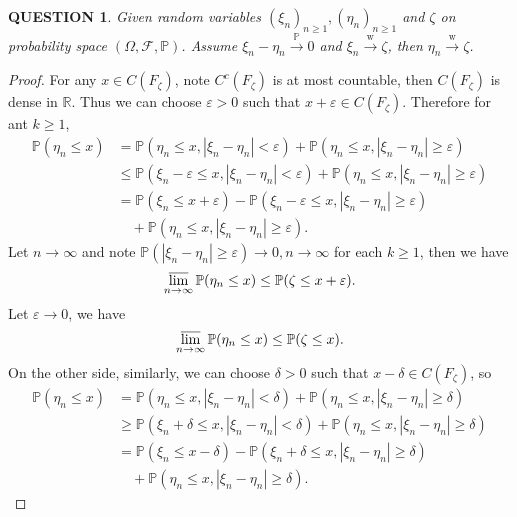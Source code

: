\documentclass[12pt]{article}
\renewcommand{\(}{\left(}%
\renewcommand{\)}{\right)}%
\renewcommand{\[}{\left[}%
\renewcommand{\]}{\right]}%
\renewcommand{\r}{\mathbb{R}}
\newcommand{\p}{\mathbb{P}}
\newcommand{\f}{\mathscr{F}}
\newtheorem{question}{QUESTION}[section]}
\newtheorem{proof}{Proof.}}
\begin{document}
  \begin{question}
  	Given random variables $(\xi_n)_{n\geq 1},(\eta_n)_{n\geq 1}$ and $\zeta$ on probability space $(\Omega,\f,\p)$. Assume $\xi_n-\eta_n\overset{\p}{\to} 0$ and $\xi_n\overset{\mathrm{w}}{\to}\zeta$, then $\eta_n\overset{\mathrm{w}}{\to}\zeta$.
  \end{question}
  \begin{proof}
  	For any $x\in C(F_\zeta)$, note $C^c(F_\zeta)$ is at most countable, then $C(F_\zeta)$ is dense in $\r$. Thus we can choose $\varepsilon>0$ such that $x+\varepsilon\in C(F_\zeta)$. Therefore for ant $k\geq 1$,
  	\begin{equation*}
  		\begin{split}
  			\p(\eta_n\leq x)&=\p(\eta_n\leq x,|\xi_n-\eta_n|<\varepsilon)+\p(\eta_n\leq x,|\xi_n-\eta_n|\geq \varepsilon)\\
  			&\leq \p(\xi_n-\varepsilon\leq x,|\xi_n-\eta_n|<\varepsilon)+\p(\eta_n\leq x,|\xi_n-\eta_n|\geq \varepsilon)\\
  			&=\p(\xi_n\leq x+\varepsilon)-\p(\xi_n-\varepsilon\leq x,|\xi_n-\eta_n|\geq \varepsilon)\\
  			&\quad+\p(\eta_n\leq x,|\xi_n-\eta_n|\geq \varepsilon).
  		\end{split}
  	\end{equation*}
  	Let $n\to\infty$ and note $\p(|\xi_n-\eta_n|\geq \varepsilon)\to0,n\to\infty$ for each $k\geq 1$, then we have
  	\begin{equation*}
  		\varlimsup_{n\to\infty}\p(\eta_n\leq x)\leq \p(\zeta\leq x+\varepsilon).
  	\end{equation*}
  	Let $\varepsilon\to0$, we have 
  	\begin{equation*}
  		\varlimsup_{n\to\infty}\p(\eta_n\leq x)\leq \p(\zeta\leq x).
  	\end{equation*}
  	On the other side, similarly, we can choose $\delta>0$ such that $x-\delta\in C(F_\zeta)$, so
  	\begin{equation*}
  		\begin{split}
  			\p(\eta_n\leq x)&=\p(\eta_n\leq x,|\xi_n-\eta_n|<\delta)+\p(\eta_n\leq x,|\xi_n-\eta_n|\geq \delta)\\
  			&\geq \p(\xi_n+\delta\leq x,|\xi_n-\eta_n|<\delta)+\p(\eta_n\leq x,|\xi_n-\eta_n|\geq \delta)\\
  			&=\p(\xi_n\leq x-\delta)-\p(\xi_n+\delta\leq x,|\xi_n-\eta_n|\geq \delta)\\
  			&\quad+\p(\eta_n\leq x,|\xi_n-\eta_n|\geq \delta).
  		\end{split}

\end{equation*}
\end{proof}
\end{document}
